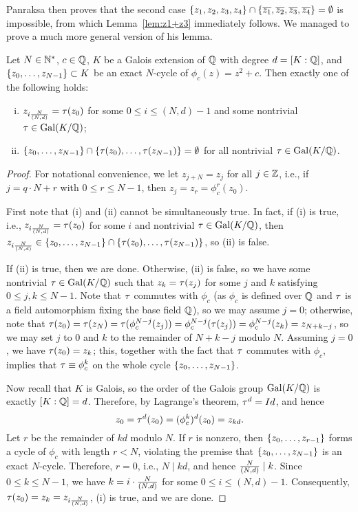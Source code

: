 Panraksa then proves that the second case $\{z_1, z_2, z_3, z_4\} \cap
\{\overline{z_1}, \overline{z_2}, \overline{z_3}, \overline{z_4}\} = \emptyset$ is impossible, from
which Lemma~\ref{lem:z1+z3} immediately follows. We managed to prove a
much more general version of his lemma.


\begin{theorem}
  Let $N \in \mathbb{N}^*$, $c \in \mathbb{Q}$, $K$ be a Galois extension of $\mathbb{Q}$ with
  degree $d = [K : \mathbb{Q}]$, and $\left\{z_0, \dots, z_{N-1}\right\} \subset K$ be
  an exact $N$-cycle of $\phi_c(z) = z^2 + c$. Then exactly one of the
  following holds:
  \begin{enumerate}[(i)]
  \item $z_{i\frac{N}{(N, d)}} = \tau(z_0)$ for some $0 \le i \le (N, d)-1$ and some
    nontrivial $\tau \in \mathrm{Gal}(K/\mathbb{Q})$;

  \item $\left\{z_0, \dots, z_{N-1}\right\} \cap \left\{\tau(z_0), \dots,
      \tau(z_{N-1})\right\} = \emptyset$ for all nontrivial $\tau \in \mathrm{Gal}(K/\mathbb{Q})$.
  \end{enumerate}
\end{theorem}

\begin{proof}
  For notational convenience, we let $z_{j+N} = z_j$ for all $j \in
  \mathbb{Z}$, i.e., if $j = q \cdot N + r$ with $0 \le r \le N-1$, then $z_j
  = z_r = \phi_c^r(z_0)$.

  First note that (i) and (ii) cannot be simultaneously true. In fact,
  if (i) is true, i.e., $z_{i\frac{N}{(N, d)}} = \tau(z_0)$ for some $i$ and
  nontrivial $\tau \in \mathrm{Gal}(K/\mathbb{Q})$, then $z_{i\frac{N}{(N, d)}} \in \left\{z_0, \dots,
    z_{N-1}\right\} \cap \left\{\tau(z_0), \dots, \tau(z_{N-1})\right\}$, so (ii) is
  false.

  If (ii) is true, then we are done. Otherwise, (ii) is false, so we
  have some nontrivial $\tau \in \mathrm{Gal}(K/\mathbb{Q})$ such that $z_k = \tau(z_j)$
  for some $j$ and $k$ satisfying $0 \le j, k \le N-1$. Note that $\tau$
  commutes with $\phi_c$ (as $\phi_c$ is defined over $\mathbb{Q}$ and $\tau$ is
  a field automorphism fixing the base field $\mathbb{Q}$), so we may assume
  $j = 0$; otherwise, note that $\tau(z_0) = \tau(z_N) =
  \tau(\phi_c^{N-j}(z_j)) = \phi_c^{N-j}(\tau(z_j)) = \phi_c^{N-j}(z_k) =
  z_{N+k-j}$, so we may set $j$ to 0 and $k$ to the remainder of
  $N+k-j$ modulo $N$. Assuming $j = 0$, we have $\tau(z_0) = z_k$; this,
  together with the fact that $\tau$ commutes with $\phi_c$, implies
  that $\tau \equiv \phi_c^k$ on the whole cycle $\left\{z_0, \dots,
    z_{N-1}\right\}$.

  Now recall that $K$ is Galois, so the order of the Galois group
  $\mathrm{Gal}(K/\mathbb{Q})$ is exactly $[K : \mathbb{Q}] = d$. Therefore, by Lagrange's
  theorem, $\tau^d = Id$, and hence
  \[
  z_0 = \tau^d(z_0) = (\phi_c^k)^d(z_0) = z_{kd}.
  \]
  Let $r$ be the remainder of $kd$ modulo $N$. If $r$ is nonzero, then
  $\left\{z_0, \dots, z_{r-1}\right\}$ forms a cycle of $\phi_c$ with length $r
  < N$, violating the premise that $\left\{z_0, \dots, z_{N-1}\right\}$ is an
  exact $N$-cycle. Therefore, $r = 0$, i.e., $N \mid kd$, and hence
  $\frac{N}{(N, d)} \mid k$. Since $0 \le k \le N - 1$, we have $k = i \cdot \frac{N}{(N, d)}$
  for some $0 \le i \le (N, d) - 1$. Consequently, $\tau(z_0) = z_k =
  z_{i\frac{N}{(N, d)}}$, (i) is true, and we are done.
\end{proof}


